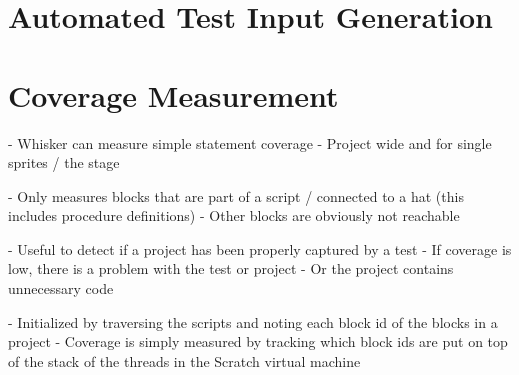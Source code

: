%
%
%
%
%

\section{Automated Test Input Generation}

\section{Coverage Measurement}
- Whisker can measure simple statement coverage
- Project wide and for single sprites / the stage

- Only measures blocks that are part of a script / connected to a hat (this includes procedure definitions)
- Other blocks are obviously not reachable

- Useful to detect if a project has been properly captured by a test
    - If coverage is low, there is a problem with the test or project
    - Or the project contains unnecessary code

- Initialized by traversing the scripts and noting each block id of the blocks in a project
- Coverage is simply measured by tracking which block ids are put on top of the stack of the threads in the Scratch virtual machine

